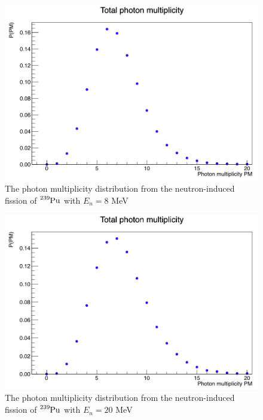 \documentclass[]{article}
\begin{document}
\begin{figure} [H]
	\centering
	\includegraphics[scale=0.36]{Pu239_8_ph_mult.png}
	\caption{The photon multiplicity distribution from the neutron-induced fission of $\ce{^{239}Pu}$ with $E_n = 8$ MeV}
	\label{fig:Pu239_8_ph_mult}
\end{figure}

\begin{figure} [H]
	\centering
	\includegraphics[scale=0.36]{Pu239_20_ph_mult.png}
	\caption{The photon multiplicity distribution from the neutron-induced fission of $\ce{^{239}Pu}$ with $E_n = 20$ MeV}
	\label{fig:Pu239_20_ph_mult}
\end{figure}
\end{document}
